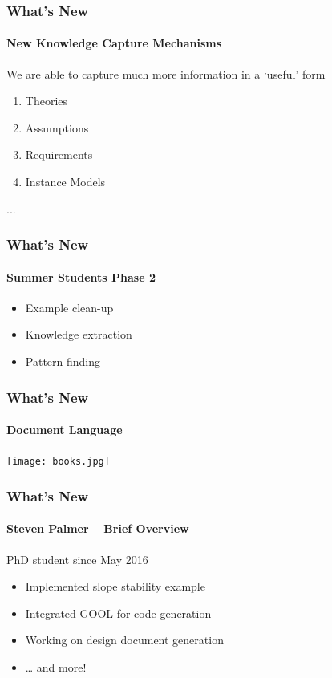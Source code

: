 \documentclass{beamer}
\begin{document}

\begin{frame}

\frametitle{What's New}
\framesubtitle{New Knowledge Capture Mechanisms}

We are able to capture much more information in a `useful' form

\begin{enumerate}
	\item Theories
	\item Assumptions
	\item Requirements
	\item Instance Models
\end{enumerate}
...

\end{frame}


\begin{frame}

\frametitle{What's New}
\framesubtitle{Summer Students Phase 2}

\begin{itemize}
\item Example clean-up
\item Knowledge extraction
\item Pattern finding
\end{itemize}

\end{frame}


\begin{frame}

\frametitle{What's New}
\framesubtitle{Document Language}

\begin{center}
\texttt{[image: books.jpg]}
\end{center}

\end{frame}


\begin{frame}

\frametitle{What's New}
\framesubtitle{Steven Palmer -- Brief Overview}

PhD student since May 2016

\begin{itemize}
\item Implemented slope stability example
\item Integrated GOOL for code generation
\item Working on design document generation
\item \ldots{} and more!
\end{itemize}

\end{frame}
\end{document}
